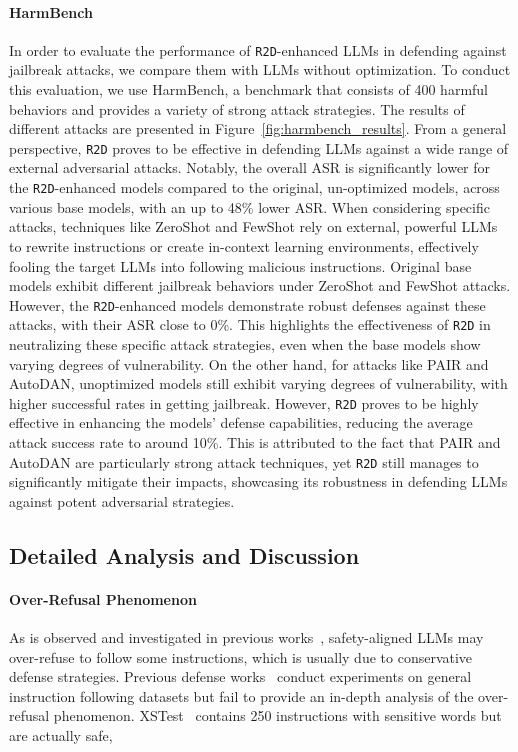 \paragraph{HarmBench} In order to evaluate the performance of \texttt{R2D}-enhanced LLMs in defending against jailbreak attacks, we compare them with LLMs without optimization. To conduct this evaluation, we use HarmBench, a benchmark that consists of 400 harmful behaviors and provides a variety of strong attack strategies. The results of different attacks are presented in Figure~\ref{fig:harmbench_results}. From a general perspective, \texttt{R2D} proves to be effective in defending LLMs against a wide range of external adversarial attacks. Notably, the overall ASR is significantly lower for the \texttt{R2D}-enhanced models compared to the original, un-optimized models, across various base models, with an up to 48\% lower ASR. When considering specific attacks, techniques like ZeroShot and FewShot rely on external, powerful LLMs to rewrite instructions or create in-context learning environments, effectively fooling the target LLMs into following malicious instructions. Original base models exhibit different jailbreak behaviors under ZeroShot and FewShot attacks. However, the \texttt{R2D}-enhanced models demonstrate robust defenses against these attacks, with their ASR close to 0\%. This highlights the effectiveness of \texttt{R2D} in neutralizing these specific attack strategies, even when the base models show varying degrees of vulnerability. On the other hand, for attacks like PAIR and AutoDAN, unoptimized models still exhibit varying degrees of vulnerability, with higher successful rates in getting jailbreak. However, \texttt{R2D} proves to be highly effective in enhancing the models' defense capabilities, reducing the average attack success rate to around 10\%. This is attributed to the fact that PAIR and AutoDAN are particularly strong attack techniques, yet \texttt{R2D} still manages to significantly mitigate their impacts, showcasing its robustness in defending LLMs against potent adversarial strategies.

\subsection{Detailed Analysis and Discussion}

\paragraph{Over-Refusal Phenomenon} As is observed and investigated in previous works~\cite{rottger-etal-2024-xstest, cui2024or, panda2024llm}, safety-aligned LLMs may over-refuse to follow some instructions, which is usually due to conservative defense strategies. Previous defense works~\cite{xu-etal-2024-safedecoding, zhou2024robust} conduct experiments on general instruction following datasets but fail to provide an in-depth analysis of the over-refusal phenomenon. XSTest~\cite{rottger-etal-2024-xstest} contains 250 instructions with sensitive words but are actually safe,

